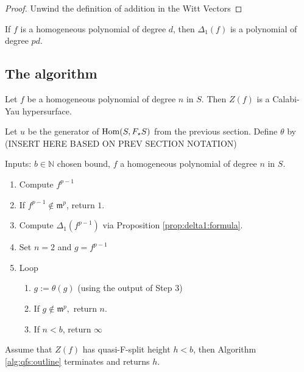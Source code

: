 \begin{proof}
	Unwind the definition of addition in the Witt Vectors
\end{proof}

\begin{rmk}
	If \(f\) is a homogeneous polynomial of degree \(d\), 
	then \(\Delta_{1}(f)\) is a polynomial of degree \(pd\).
\end{rmk}

\subsection{The algorithm}

Let \(f\) be a homogeneous polynomial of degree \(n\) 
in \(S\). 
Then \(Z(f)\) is a Calabi-Yau hypersurface.

Let \(u\) be the generator of \(\operatorname{Hom}(S,F_{\star}S)\) from the 
previous section.
Define \(\theta\) by  (INSERT HERE BASED ON PREV SECTION NOTATION)

\begin{alg}
	\label{alg:qfs:outline}

	Inputs: \(b \in \mathbb{N}\) chosen bound, \(f\) a homogeneous
	polynomial of degree \(n\) in \(S\).
	\begin{enumerate}[(1)]
		\item Compute \(f^{p-1}\)
		\item If \(f^{p-1} \notin \mathfrak{m}^{p}\), return \(1\). 
		\item Compute \(\Delta_{1}(f^{p-1})\) via Proposition \ref{prop:delta1:formula}.
		\item Set \(n = 2\) and \(g = f^{p-1}\)
		\item Loop
			\begin{enumerate}[(1)]
				\item \(g := \theta(g)\) (using the output of Step 3)
				\item If \(g \notin \mathfrak{m}^{p},\) return \(n\).
				\item If \(n < b\), return \(\infty\)	
			\end{enumerate}
	\end{enumerate}
\end{alg}

\begin{theorem}
	Assume that
	\(Z(f)\) has quasi-F-split height \(h < b\),
	then Algorithm \ref{alg:qfs:outline} terminates
	and returns \(h\).
\end{theorem}

